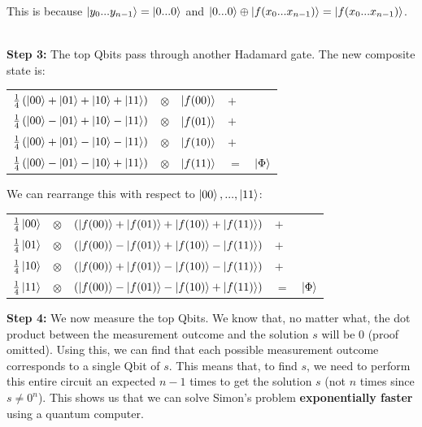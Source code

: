 \documentclass[12pt]{article}
\begin{document}
\noindent
This is because $\ket{y_0 ... y_{n - 1}} = \ket{0 ... 0}$ and $\ket{0 ... 0} \oplus \ket{f(x_0 ... x_{n - 1})} = \ket{f(x_0 ... x_{n - 1})}$.

\noindent
\\
\textbf{Step 3:} The top Qbits pass through another Hadamard gate.
The new composite state is:

\newpage

\begin{table}[h]
    \centering
    \begin{tabular}{lllll}
    $\frac{1}{4}\left( \ket{00} + \ket{01} + \ket{10} + \ket{11} \right)$ & $\otimes$ & $\ket{f(00)}$ & $+$ &  \\
    $\frac{1}{4}\left( \ket{00} - \ket{01} + \ket{10} - \ket{11} \right)$ & $\otimes$ & $\ket{f(01)}$ & $+$ &  \\
    $\frac{1}{4}\left( \ket{00} + \ket{01} - \ket{10} - \ket{11} \right)$ & $\otimes$ & $\ket{f(10)}$ & $+$ &  \\
    $\frac{1}{4}\left( \ket{00} - \ket{01} - \ket{10} + \ket{11} \right)$ & $\otimes$ & $\ket{f(11)}$ & $=$ & $\ket{\Phi}$
    \end{tabular}
\end{table}

\noindent
We can rearrange this with respect to $\ket{00}, ... , \ket{11}$:

\begin{table}[h]
    \centering
    \begin{tabular}{lllll}
    $\frac{1}{4}\ket{00}$ & $\otimes$ & $\left( \ket{f(00)} + \ket{f(01)} + \ket{f(10)} + \ket{f(11)} \right)$ & $+$ &  \\
    $\frac{1}{4}\ket{01}$ & $\otimes$ & $\left( \ket{f(00)} - \ket{f(01)} + \ket{f(10)} - \ket{f(11)} \right)$ & $+$ &  \\
    $\frac{1}{4}\ket{10}$ & $\otimes$ & $\left( \ket{f(00)} + \ket{f(01)} - \ket{f(10)} - \ket{f(11)} \right)$ & $+$ &  \\
    $\frac{1}{4}\ket{11}$ & $\otimes$ & $\left( \ket{f(00)} - \ket{f(01)} - \ket{f(10)} + \ket{f(11)} \right)$ & $=$ & $\ket{\Phi}$ \\
    \end{tabular}
\end{table}

\noindent
\textbf{Step 4:} We now measure the top Qbits.
We know that, no matter what, the dot product between the measurement outcome and the solution $s$ will be 0 (proof omitted).
Using this, we can find that each possible measurement outcome corresponds to a single Qbit of $s$.
This means that, to find $s$, we need to perform this entire circuit an expected $n - 1$ times to get the solution $s$ (not $n$ times since $s \neq 0^n$).
This shows us that we can solve Simon's problem \textbf{exponentially faster} using a quantum computer.
\end{document}
